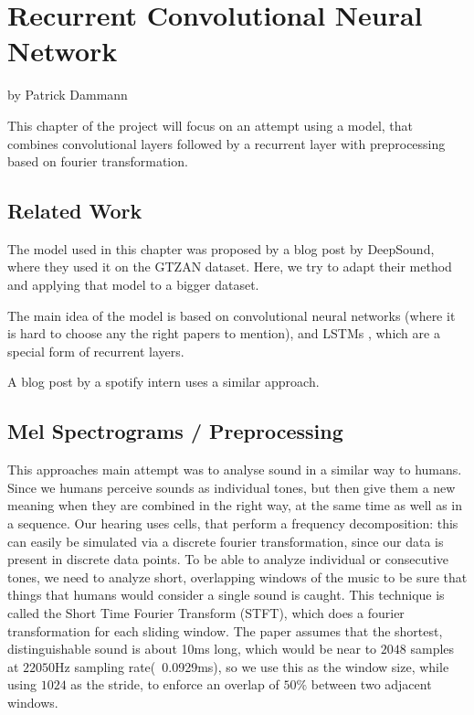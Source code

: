 \def\code#1{\mbox{\texttt{#1}}}


\chapter{Recurrent Convolutional Neural Network}
by Patrick Dammann

\bigskip

This chapter of the project will focus on an attempt using a model, that combines convolutional layers followed by a recurrent layer with preprocessing based on fourier transformation.

\section{Related Work}
\label{sec:rcnn-related}

The model used in this chapter was proposed by a blog post  by DeepSound, where they used it on the GTZAN  dataset. Here, we try to adapt their method and applying that model to a bigger dataset.

The main idea of the model is based on convolutional neural networks (where it is hard to choose any the right papers to mention), and LSTMs , which are a special form of recurrent layers.

A blog post  by a spotify intern uses a similar approach.

\section{Mel Spectrograms / Preprocessing}
\label{sec:rcnn-mels}

This approaches main attempt was to analyse sound in a similar way to humans. Since we humans perceive sounds as individual tones, but then give them a new meaning when they are combined in the right way, at the same time as well as in a sequence. Our hearing uses cells, that perform a frequency decomposition: this can easily be simulated via a discrete fourier transformation, since our data is present in discrete data points. To be able to analyze individual or consecutive tones, we need to analyze short, overlapping windows of the music to be sure that things that humans would consider a single sound is caught. This technique is called the Short Time Fourier Transform (STFT), which does a fourier transformation for each sliding window. The paper assumes that the shortest, distinguishable sound is about 10ms long, which would be near to $2048$ samples at $22050$Hz sampling rate(~0.0929ms), so we use this as the window size, while using $1024$ as the stride, to enforce an overlap of $50\%$ between two adjacent windows.

